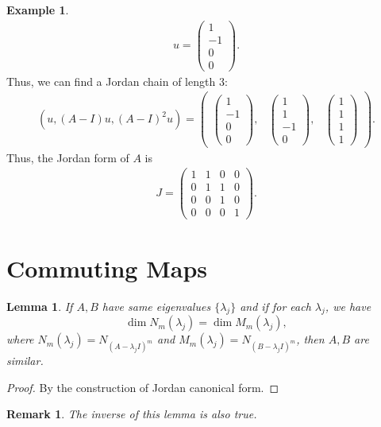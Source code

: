 \documentclass[11pt]{book}
\newtheorem{lemma}[theorem]{Lemma}
\newtheorem{remark}{Remark}[section]
\theoremstyle{definition}
\newtheorem{example}{Example}[section]
\numberwithin{equation}{chapter}
\begin{document}
\begin{example}
\begin{align*}
    u = \begin{pmatrix}
    1 \\
    -1 \\
    0 \\
    0
    \end{pmatrix}.
\end{align*}
Thus, we can find a Jordan chain of length $3$:
\begin{align*}
    (u, (A-I)u,(A-I)^2u) = 
    \begin{pmatrix}
        \begin{pmatrix}1 \\ -1 \\ 0 \\ 0 \end{pmatrix}, & 
        \begin{pmatrix}1 \\ 1 \\ -1 \\ 0 \end{pmatrix}, & 
        \begin{pmatrix}1 \\ 1 \\ 1 \\ 1 \end{pmatrix}
    \end{pmatrix}.
\end{align*}
Thus, the Jordan form of $A$ is 
\begin{align*}
    J = \begin{pmatrix}
    1 & 1 & 0 & 0 \\
    0 & 1 & 1 & 0 \\
    0 & 0 & 1 & 0 \\
    0 & 0 & 0 & 1
    \end{pmatrix}.
\end{align*}
\end{example}

\medskip

\section{Commuting Maps}
\begin{lemma}
If $A,B$ have same eigenvalues $\{\lambda_j\}$ and if for each $\lambda_j$, we have
$$\dim N_m(\lambda_j) = \dim M_m(\lambda_j),$$
where $N_m(\lambda_j) = N_{(A - \lambda_j I)^m}$ and $M_m(\lambda_j) = N_{(B - \lambda_j I)^m}$, then $A, B$ are similar.
\end{lemma}
\begin{proof}
By the construction of Jordan canonical form.
\end{proof}
\begin{remark}
The inverse of this lemma is also true.
\end{remark}
\end{document}
